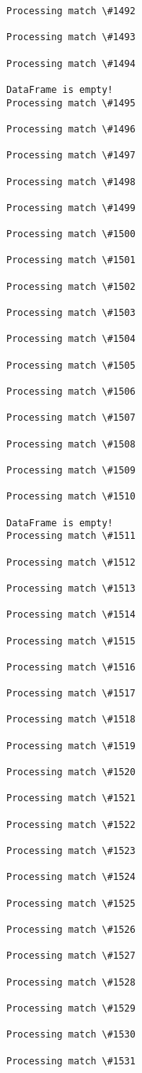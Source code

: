 \documentclass[11pt]{article}
\begin{document}
\begin{Verbatim}[commandchars=\\\{\}]
Processing match \#1492

Processing match \#1493

Processing match \#1494

DataFrame is empty!
Processing match \#1495

Processing match \#1496

Processing match \#1497

Processing match \#1498

Processing match \#1499

Processing match \#1500

Processing match \#1501

Processing match \#1502

Processing match \#1503

Processing match \#1504

Processing match \#1505

Processing match \#1506

Processing match \#1507

Processing match \#1508

Processing match \#1509

Processing match \#1510

DataFrame is empty!
Processing match \#1511

Processing match \#1512

Processing match \#1513

Processing match \#1514

Processing match \#1515

Processing match \#1516

Processing match \#1517

Processing match \#1518

Processing match \#1519

Processing match \#1520

Processing match \#1521

Processing match \#1522

Processing match \#1523

Processing match \#1524

Processing match \#1525

Processing match \#1526

Processing match \#1527

Processing match \#1528

Processing match \#1529

Processing match \#1530

Processing match \#1531


\end{Verbatim}
\end{document}
